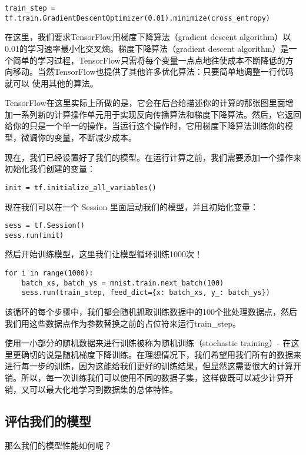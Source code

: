 \begin{lstlisting}
train_step = tf.train.GradientDescentOptimizer(0.01).minimize(cross_entropy)
\end{lstlisting}

在这里，我们要求TensorFlow用梯度下降算法（gradient descent algorithm）以0.01的学习速率最小化交叉熵。梯度下降算法（gradient descent algorithm）是一个简单的学习过程，TensorFlow只需将每个变量一点点地往使成本不断降低的方向移动。当然TensorFlow也提供了其他许多优化算法：只要简单地调整一行代码就可以
使用其他的算法。

TensorFlow在这里实际上所做的是，它会在后台给描述你的计算的那张图里面增加一系列新的计算操作单元用于实现反向传播算法和梯度下降算法。然后，它返回给你的只是一个单一的操作，当运行这个操作时，它用梯度下降算法训练你的模型，微调你的变量，不断减少成本。

现在，我们已经设置好了我们的模型。在运行计算之前，我们需要添加一个操作来初始化我们创建的变量：

\begin{lstlisting}
init = tf.initialize_all_variables()
\end{lstlisting}

现在我们可以在一个 Session 里面启动我们的模型，并且初始化变量：
\begin{lstlisting}
sess = tf.Session()
sess.run(init)
\end{lstlisting}

然后开始训练模型，这里我们让模型循环训练1000次！
\begin{lstlisting}
for i in range(1000):
    batch_xs, batch_ys = mnist.train.next_batch(100)
    sess.run(train_step, feed_dict={x: batch_xs, y_: batch_ys})
\end{lstlisting}

该循环的每个步骤中，我们都会随机抓取训练数据中的100个批处理数据点，然后我们用这些数据点作为参数替换之前的占位符来运行train\_step。

使用一小部分的随机数据来进行训练被称为随机训练（stochastic training）- 在这里更确切的说是随机梯度下降训练。在理想情况下，我们希望用我们所有的数据来进行每一步的训练，因为这能给我们更好的训练结果，但显然这需要很大的计算开销。所以，每一次训练我们可以使用不同的数据子集，这样做既可以减少计算开销，又可以最大化地学习到数据集的总体特性。

\subsection{评估我们的模型}

那么我们的模型性能如何呢？

